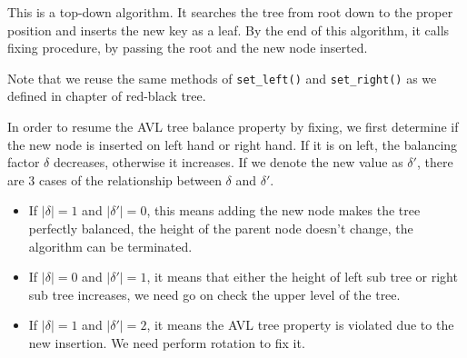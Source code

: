 \documentclass{article}
\begin{document}
This is a top-down algorithm. It searches the tree from root down to the proper
position and inserts the new key as a leaf. By the end of this algorithm, it calls fixing procedure, by passing the root and the new node inserted.

Note that we reuse the same methods of \texttt{set\_left()} and \texttt{set\_right()} as
we defined in chapter of red-black tree.

In order to resume the AVL tree balance property by fixing, we first determine if the new node is inserted on left hand or right hand. If it is on left, the balancing factor $\delta$ decreases, otherwise it increases. If we denote the new value as $\delta'$, there are 3 cases of the relationship between $\delta$ and $\delta'$.

\begin{itemize}
\item If $|\delta| = 1$ and $|\delta'| = 0$, this means adding the new node makes the tree perfectly balanced, the height of the parent node doesn't change, the algorithm can be terminated.

\item If $|\delta| = 0$ and $|\delta'| = 1$, it means that either the height of left sub tree or right sub tree increases, we need go on check the upper level of the tree.

\item If $|\delta| = 1$ and $|\delta'| = 2$, it means the AVL tree property is violated due to the new insertion. We need perform rotation to fix it.
\end{itemize}
\end{document}
